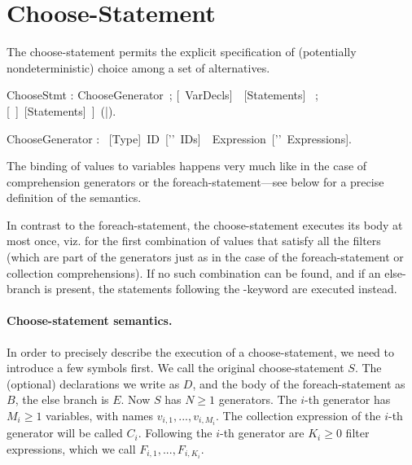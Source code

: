 

\section{Choose-Statement}\label{sect:NDChoice}


The choose-statement permits the explicit specification of
(potentially nondeterministic) choice among a set of alternatives.


\bgr
ChooseStmt : ChooseGenerator~;
     [\kwVar~VarDecls]~\kwDo~[Statements]~ ;
     [\kwElse
     [[\kwVar~LocalVarDecls]~\kwDo]~[Statements]~]~(\kwEnd|\kwEndChoose).

ChooseGenerator : \kwChoose~[Type]~ID~['\charComma'~IDs]~\kwIn~Expression~['\charComma'~Expressions].
\egr


The binding of values to variables happens very much like in the case
of comprehension generators or the foreach-statement---see below for a
precise definition of the semantics.


In contrast to the foreach-statement, the choose-statement executes
its body at most once, viz. for the first combination of values that
satisfy all the filters (which are part of the generators just as in
the case of the foreach-statement or collection comprehensions). If no
such combination can be found, and if an else-branch is present, the
statements following the \kwElse-keyword are executed instead.

\paragraph{Choose-statement semantics.}
In order
to precisely describe the execution of a choose-statement, we need to
introduce a few symbols first. We call the original choose-statement
$S$. The (optional) declarations we write as $D$, and the body of the
foreach-statement as $B$, the else branch is $E$. Now $S$ has $N \geq
1$ generators. The $i$-th generator has $M_i \geq 1$ variables, with
names $v_{i,1}, ..., v_{i, {M_i}}$. The collection expression of the
$i$-th generator will be called $C_i$.  Following the $i$-th generator
are $K_i \geq 0$ filter expressions, which we call $F_{i, 1}, ...,
F_{i, {K_i}}$.

